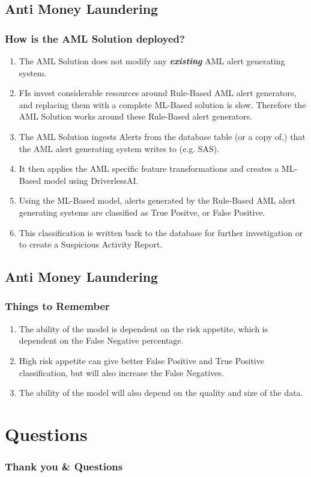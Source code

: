 \documentclass[11pt,
               aspectratio=169,
               hyperref={colorlinks}
               ]{beamer}
\begin{document}
		\subsection{Anti Money Laundering}
	\begin{frame}
		\frametitle{How is the AML Solution deployed?}
		
		\begin{enumerate}
			\item The AML Solution does not modify any \textbf{\textit{existing}} AML alert generating system. 
			\item FIs invest considerable resources around Rule-Based AML alert generators, and replacing them with a complete ML-Based solution is slow. Therefore the AML Solution works around these Rule-Based alert generators. 
			\item The AML Solution ingests Alerts from the database table (or a copy of,)  that the AML alert generating system writes to (e.g. SAS). 
			\item It then applies the AML specific feature transformations and creates a ML-Based model using DriverlessAI.
			\item Using the ML-Based model, alerts generated by the Rule-Based AML alert generating systems are classified as True Positve, or False Positive. 
			\item This classification is written back to the database for further investigation or to create a Suspicious Activity Report.
		\end{enumerate}
	\end{frame}

		\subsection{Anti Money Laundering}
	\begin{frame}
		\frametitle{Things to Remember}
		
		\begin{enumerate}
			\item The ability of the model is dependent on the risk appetite, which is dependent on the False Negative percentage. 
			\item High risk appetite can give better False Positive and True Positive classification, but will also increase the False Negatives. 
			\item The ability of the model will also depend on the quality and size of the data. 
		\end{enumerate}
	\end{frame}

	\section{Questions}

		\begin{frame}

			\frametitle{Thank you \& Questions}

		\end{frame}
\end{document}
